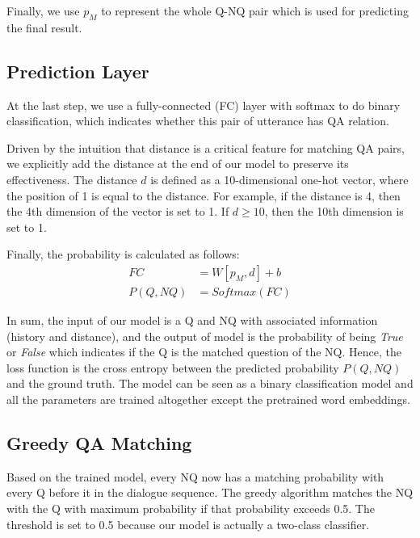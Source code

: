 Finally, we use $p_M$ to represent the whole Q-NQ pair which is used for predicting the final result.

\subsection{Prediction Layer }
At the last step, we use a fully-connected (FC) layer with softmax to do binary classification, which indicates whether this pair of utterance has QA relation.

Driven by the intuition that distance is a critical feature 
for matching QA pairs, %
we explicitly add the distance at the end of our model to 
preserve its effectiveness. The distance $d$ is defined as 
a 10-dimensional one-hot vector, where the position of 
1 is equal to the distance. For example, if the distance is 4, then
the 4th dimension of the vector is set to 1. If $d\geq 10$, then the 10th
dimension is set to 1.

Finally, the probability is calculated as follows:
\begin{equation}
\begin{aligned}
FC&=W[p_M,d]+b\\
P(Q,NQ)&=Softmax(FC)
\end{aligned}
\end{equation}

In sum, the input of our model is a Q and NQ with associated information (history and distance), and the output of model is the probability of being \textit{True} or \textit{False} which indicates if the Q is the matched question of the NQ. Hence, the loss function is the cross entropy between the predicted probability $P(Q,NQ)$ and the ground truth. The model can be seen as a binary classification model and all the parameters are trained altogether except the pretrained word embeddings.

\subsection{Greedy QA Matching}

Based on the trained model, every NQ now has a matching probability with every Q 
before it in the dialogue sequence. The greedy algorithm matches the NQ with the
Q with maximum probability if that probability exceeds 0.5.
The threshold is set to 0.5 because our model is actually a two-class classifier.




